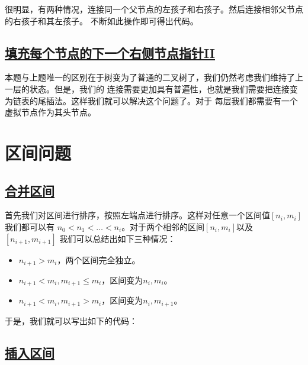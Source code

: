 \documentclass[../../main.tex]{subfiles}
\begin{document}
很明显，有两种情况，连接同一个父节点的左孩子和右孩子。然后连接相邻父节点的右孩子和其左孩子。
不断如此操作即可得出代码。



\subsection{\href{https://leetcode.cn/problems/populating-next-right-pointers-in-each-node-ii/}
{填充每个节点的下一个右侧节点指针II}}

本题与上题唯一的区别在于树变为了普通的二叉树了，我们仍然考虑我们维持了上一层的状态。但是，我们的
连接需要更加具有普遍性，也就是我们需要把连接变为链表的尾插法。这样我们就可以解决这个问题了。对于
每层我们都需要有一个虚拟节点作为其头节点。



\section{区间问题}

\subsection{\href{https://leetcode.cn/problems/merge-intervals/}{合并区间}}

首先我们对区间进行排序，按照左端点进行排序。这样对任意一个区间值$[n_{i}, m_{i}]$我们都可以有
$n_{0} < n_{1} < \dots < n_{i}$。对于两个相邻的区间$[n_{i}, m_{i}]$以及$[n_{i + 1}, m_{i + 1}]$
我们可以总结出如下三种情况：

\begin{itemize}
  \item $n_{i + 1} > m_{i}$，两个区间完全独立。
  \item $n_{i + 1} < m_{i}, m_{i + 1} \leq m_{i}$，区间变为$n_{i}, m_{i}$。
  \item $n_{i + 1} < m_{i}, m_{i + 1} > m_{i}$，区间变为$n_{i}, m_{i + 1}$。
\end{itemize}

于是，我们就可以写出如下的代码：



\subsection{\href{https://leetcode.cn/problems/insert-interval/}{插入区间}}
\end{document}

